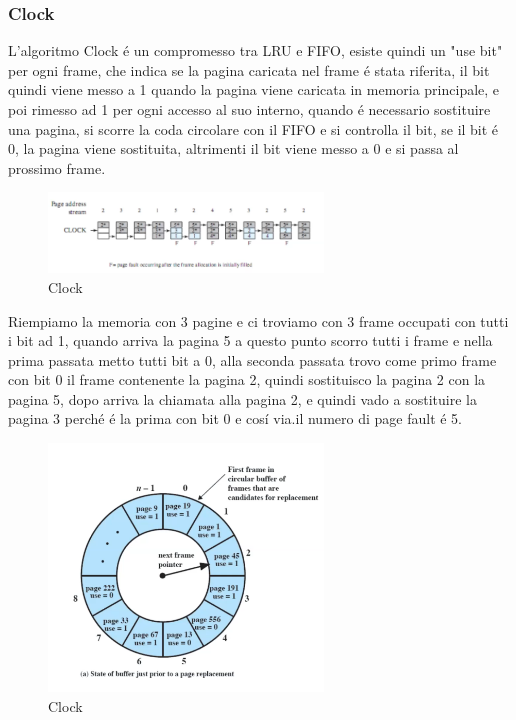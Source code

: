     \subsubsection*{Clock}
    L'algoritmo Clock é un compromesso tra LRU e FIFO, esiste quindi un "use bit" per ogni frame, che indica se la pagina caricata nel
    frame é stata riferita, il bit quindi viene messo a 1 quando la pagina viene caricata in memoria principale, e poi rimesso ad 1
    per ogni accesso al suo interno, quando é necessario sostituire una pagina, si scorre la coda circolare con il FIFO e si
    controlla il bit, se il bit é 0, la pagina viene sostituita, altrimenti il bit viene messo a 0 e si passa al prossimo frame.
    \begin{figure}[H]
        \centering
        \includegraphics[width=0.65\textwidth]{immagini/AlgoritmoSostituzioneClock}
        \caption{Clock}
    \end{figure}
    Riempiamo la memoria con 3 pagine e ci troviamo con 3 frame occupati con tutti i bit ad 1, quando arriva la pagina 5
    a questo punto scorro tutti i frame e nella prima passata metto tutti bit a 0, alla seconda passata trovo come primo frame
    con bit  0 il frame contenente la pagina 2, quindi sostituisco la pagina 2 con la pagina 5, dopo arriva la chiamata alla
    pagina 2, e quindi vado a sostituire la pagina 3 perché é la prima con bit 0 e cosí via.il numero di page fault é 5.
    \begin{figure}[H]
        \centering
        \includegraphics[width=0.65\textwidth]{immagini/AlgoritmoSostituzioneClockComplesso}
        \caption{Clock}
    \end{figure}
